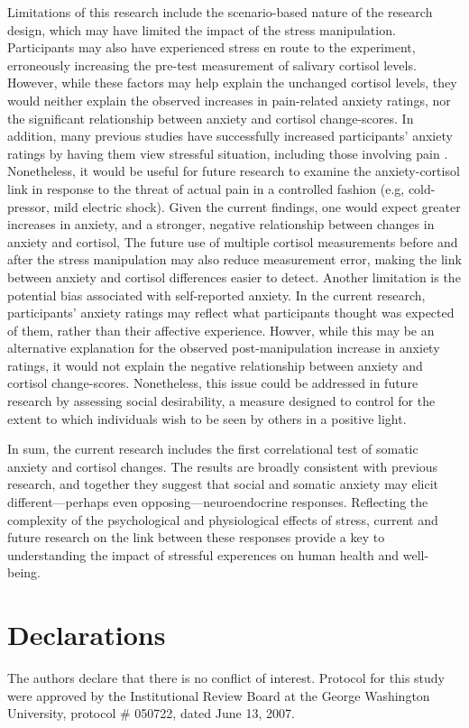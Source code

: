 \documentclass[review]{elsarticle}\usepackage[]{graphicx}\usepackage[]{color}
\begin{document}
Limitations of this research include the scenario-based nature of the research design, which may have limited the impact of the stress manipulation.
Participants may also have experienced stress en route to the experiment, erroneously increasing the pre-test measurement of salivary cortisol levels.
However, while these factors may help explain the unchanged cortisol levels, they would neither explain the observed increases in pain-related anxiety ratings, nor the significant relationship between anxiety and cortisol change-scores.
In addition, many previous studies have successfully increased participants' anxiety ratings by having them view stressful situation, including those involving pain \cite{kennedy2011makes,moore2010cognitive}.
Nonetheless, it would be useful for future research to examine the anxiety-cortisol link in response to the threat of actual pain in a controlled fashion (e.g, cold-pressor, mild electric shock).
Given the current findings, one would expect greater increases in anxiety, and a stronger, negative relationship between changes in anxiety and cortisol,
The future use of multiple cortisol measurements before and after the stress manipulation may also reduce measurement error, making the link between anxiety and cortisol differences easier to detect.
Another limitation is the potential bias associated with self-reported anxiety.
In the current research, participants' anxiety ratings may reflect what participants thought was expected of them, rather than their affective experience.
Howver, while this may be an alternative explanation for the observed post-manipulation increase in anxiety ratings, it would not explain the negative relationship between anxiety and cortisol change-scores.
Nonetheless, this issue could be addressed in future research by assessing social desirability, a measure designed to control for the extent to which individuals wish to be seen by others in a positive light.

In sum, the current research includes the first correlational test of somatic anxiety and cortisol changes.
The results are broadly consistent with previous research, and together they suggest that social and somatic anxiety may elicit different---perhaps even opposing---neuroendocrine responses.
Reflecting the complexity of the psychological and physiological effects of stress, current and future research on the link between these responses provide a key to understanding the impact of stressful experences on human health and well-being.


\section*{Declarations}

The authors declare that there is no conflict of interest.
Protocol for this study were approved by the Institutional Review Board at the George Washington University, protocol \# 050722, dated June 13, 2007.

\pagebreak



\end{document}

